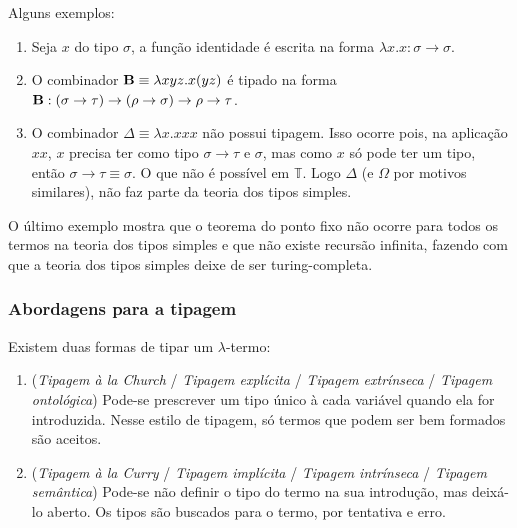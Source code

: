 \documentclass[../main.tex]{subfiles}
\begin{document}
Alguns exemplos:

\begin{enumerate}
    \item Seja $x$ do tipo $\sigma$, a função identidade é escrita na forma $\lambda x . x : \sigma \to \sigma$.
    \item O combinador $\text{\textbf{B}} \equiv \lambda xyz . x(yz)$ é tipado na forma $\text{\textbf{B}} : (\sigma \to \tau) \to (\rho \to \sigma) \to \rho \to \tau$.
    \item O combinador $\Delta \equiv \lambda x . xxx$ não possui tipagem. Isso ocorre pois, na aplicação $xx$, $x$ precisa ter como tipo $\sigma \to \tau$ e $\sigma$, mas como $x$ só pode ter um tipo, então $\sigma \to \tau \equiv \sigma$. O que não é possível em $\mathbb{T}$. Logo $\Delta$ (e $\Omega$ por motivos similares), não faz parte da teoria dos tipos simples.
\end{enumerate}

O último exemplo mostra que o teorema do ponto fixo não ocorre para todos os termos na teoria dos tipos simples e que não existe recursão infinita, fazendo com que a teoria dos tipos simples deixe de ser turing-completa.

\subsubsection{Abordagens para a tipagem}

Existem duas formas de tipar um $\lambda$-termo:

\begin{enumerate}
    \item (\emph{Tipagem à la Church} / \emph{Tipagem explícita} / \emph{Tipagem extrínseca} / \emph{Tipagem ontológica}) Pode-se prescrever um tipo único à cada variável quando ela for introduzida. Nesse estilo de tipagem, só termos que podem ser bem formados são aceitos. 
    \item (\emph{Tipagem à la Curry} / \emph{Tipagem implícita} / \emph{Tipagem intrínseca} / \emph{Tipagem semântica}) Pode-se não definir o tipo do termo na sua introdução, mas deixá-lo aberto. Os tipos são buscados para o termo, por tentativa e erro.
\end{enumerate}
\end{document}
